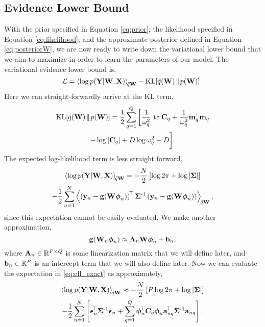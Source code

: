 \subsection{Evidence Lower Bound}
%
With the prior specified in Equation \eqref{eq:prior}; the likelihood 
specified in Equation \eqref{eq:likelihood}; and the approximate 
posterior defined in Equation \eqref{eq:posteriorW}, we are now ready 
to write down the variational lower bound that we aim to maximize 
in order to learn the parameters of our model.
%
The variational evidence lower bound is,
\begin{equation}
    \mathcal{L} = \left\langle{\log \ensuremath{p\!\left({\mathbf{Y}}\middle\vert{\ensuremath{\mathbf{W}}, \ensuremath{\mathbf{X}}}\right)}}\right\rangle_{\!{\tilde{q}\mathbf{W}}}
        - \text{KL}\!\left[{{\tilde{q}\!\left({\mathbf{W}}\right)}\!\parallel\!{p\!\left({\mathbf{W}}\right)}}\right].
\end{equation}
Here we can straight-forwardly arrive at the KL term,
\begin{multline}
    \text{KL}\!\left[{{\tilde{q}\!\left({\mathbf{W}}\right)}\!\parallel\!{p\!\left({\mathbf{W}}\right)}}\right]  = 
        \frac{1}{2} \sum^{Q}_{q=1}
        \bigg[
        \frac{1}{\omega^2_q}\mbox{ \rm tr }{\ensuremath{\mathbf{C}}_q}
        + \frac{1}{\omega^2_q} \mathbf{m}_q^{\!\top}\mathbf{m}_q \\
         - \log\left|{\mathbf{C}_q}\right| + D \log \omega^2_q - D
        \bigg].
    \label{eq:KL}
\end{multline}
%
The expected log-likelihood term is less straight forward,
\begin{multline}
    \left\langle{\log \ensuremath{p\!\left({\mathbf{Y}}\middle\vert{\ensuremath{\mathbf{W}}, \ensuremath{\mathbf{X}}}\right)}}\right\rangle_{\!{\tilde{q}\mathbf{W}}}  = 
    - \frac{N}{2}
    \left[{\log{2\pi} + \log\left|{\mathbf{\Sigma}}\right|}\right]  \\
    - \frac{1}{2} \sum^N_{n=1} \left\langle{
        \ensuremath{\left({\mathbf{y}_n - \mathbf{g}\!\left({{\mathbf{W}\boldsymbol\phi_n}}\right)}\right)}\ensuremath{^{\!\top}}\ensuremath{\mathbf{\Sigma}}\ensuremath{^{\text{-}1}}\ensuremath{\left({\mathbf{y}_n - \mathbf{g}\!\left({{\mathbf{W}\boldsymbol\phi_n}}\right)}\right)}}\right\rangle_{\!{\tilde{q}\mathbf{W}}},
    \label{eq:ell_exact}
\end{multline}
since this expectation cannot be easily evaluated. We make another
approximation,
\begin{equation}
    \mathbf{g}\!\left({{\mathbf{W}_n\boldsymbol\phi_n}}\right) \approx \mathbf{A}_n \mathbf{W}\boldsymbol\phi_n + \mathbf{b}_n,
    \label{eq:linapprox}
\end{equation}
where $\mathbf{A}_n \in \mathbb{R}^{P \times Q}$ is some linearization matrix
that we will define later, and $\mathbf{b}_n \in \mathbb{R}^{P}$ is an intercept
term that we will also define later. Now we can evaluate the expectation in 
\eqref{eq:ell_exact} as approximately,
\begin{multline}
    \left\langle{\log \ensuremath{p\!\left({\mathbf{Y}}\middle\vert{\ensuremath{\mathbf{W}}, \ensuremath{\mathbf{X}}}\right)}}\right\rangle_{\!{\tilde{q}\mathbf{W}}} \approx
    - \frac{N}{2}\left[{P\log{2\pi} + \log\left|{\mathbf{\Sigma}}\right|}\right] \\
    - \frac{1}{2} \sum^N_{n=1} 
    \left[{
        \boldsymbol{ \epsilon }_n ^{\!\top}  \mathbf{\Sigma}^{\text{-}1}   \boldsymbol{ \epsilon }_n  
        + \sum^Q_{q=1} 
            \boldsymbol\phi_n^{\!\top}\mathbf{C}_q  \boldsymbol\phi_n\mathbf{a}_{nq}^{\!\top}\mathbf{\Sigma}^{\text{-}1} \mathbf{a}_{nq}
        }\right].
    \label{eq:ell_approx}
\end{multline}
